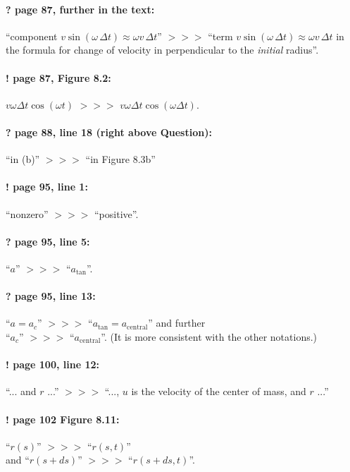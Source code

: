 \documentclass[twoside]{article}
\begin{document}
\paragraph{? page 87, further in the text:} ``component $v \sin(\omega \,\Delta t) \approx \omega v \,\Delta t$'' $>\!>\!>$ ``term $v \sin(\omega \,\Delta t) \approx \omega v \,\Delta t$ in the formula for change of velocity in perpendicular to the \emph{initial} radius''.

\paragraph{! page 87, Figure 8.2:} $v\omega\Delta t\cos(\omega t)$ $>\!>\!>$ $v\omega\Delta t\cos(\omega \Delta t)$.

\paragraph{? page 88, line 18 (right above Question):} ``in (b)'' $>\!>\!>$ ``in Figure 8.3b''

\paragraph{! page 95, line 1:} ``nonzero'' $>\!>\!>$ ``positive''.

\paragraph{? page 95, line 5:} ``$a$'' $>\!>\!>$ ``$a_{\mathrm{tan}}$''.

\paragraph{? page 95, line 13:} ``$a=a_c$'' $>\!>\!>$ ``$a_{\mathrm{tan}}=a_{\mathrm{central}}$'' and further\\
``$a_c$'' $>\!>\!>$ ``$a_{\mathrm{central}}$''. (It is more consistent with the other notations.)

\paragraph{! page 100, line 12:} ``... and $r$ ...'' $>\!>\!>$ ``..., $u$ is the velocity of the center of mass, and $r$ ...''

\paragraph{! page 102 Figure 8.11:} ``$r(s)$'' $>\!>\!>$ ``$r(s,t)$''\\ and ``$r(s+ds)$'' $>\!>\!>$ ``$r(s+ds,t)$''.
\end{document}
